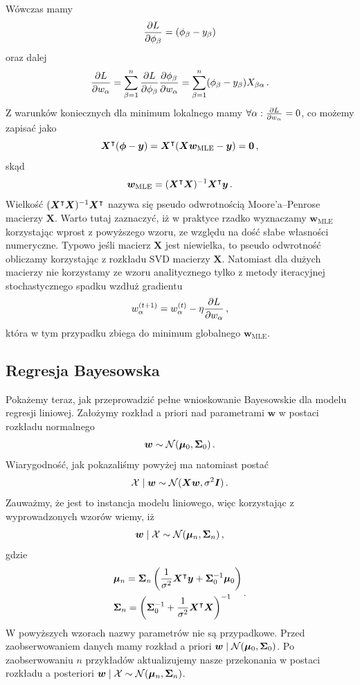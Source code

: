 \documentclass{myclass}
\begin{document}
Wówczas mamy
\[
    \pdv{L}{\phi_\beta} = (\phi_\beta - y_\beta)
\]
oraz dalej
\[
    \pdv{L}{w_\alpha} = \sum_{\beta=1}^n \pdv{L}{\phi_\beta} \pdv{\phi_\beta}{w_\alpha} = \sum_{\beta=1}^n (\phi_\beta - y_\beta) X_{\beta\alpha}\,.
\]
Z warunków koniecznych dla minimum lokalnego mamy \(\forall \alpha : \pdv{L}{w_\alpha} = 0\), co
możemy zapisać jako
\[
    \bm{X}^\intercal(\bm{\phi} - \bm{y}) = \bm{X}^\intercal(\bm{X}\bm{w}_\text{MLE} - \bm{y}) = \bm{0}\,,
\]
skąd
\[
    \bm{w}_\text{MLE} = (\bm{X}^\intercal \bm{X})^{-1} \bm{X}^\intercal \bm{y}\,.
\]
Wielkość \((\bm{X}^\intercal \bm{X})^{-1} \bm{X}^\intercal\) nazywa się pseudo odwrotnością
Moore'a--Penrose macierzy \(\bm{X}\). Warto tutaj zaznaczyć, iż w praktyce rzadko wyznaczamy
\(\bm{w}_\text{MLE}\) korzystając wprost z powyższego wzoru, ze względu na dość słabe własności
numeryczne. Typowo jeśli macierz \(\bm{X}\) jest niewielka, to pseudo odwrotność obliczamy
korzystając z rozkładu SVD macierzy \(\bm{X}\). Natomiast dla dużych macierzy nie korzystamy ze
wzoru analitycznego tylko z metody iteracyjnej stochastycznego spadku wzdłuż gradientu
\[
    w_\alpha^{(t+1)} = w_\alpha^{(t)} - \eta \pdv{L}{w_\alpha}\,,
\]
która w tym przypadku zbiega do minimum globalnego \(\bm{w}_\text{MLE}\).

\subsection{Regresja Bayesowska}

Pokażemy teraz, jak przeprowadzić pełne wnioskowanie Bayesowskie dla modelu regresji liniowej.
Założymy rozkład a priori nad parametrami \(\bm{w}\) w postaci rozkładu normalnego
\[
    \bm{w} \sim \mathcal{N}(\bm{\mu}_0, \bm{\Sigma}_0)\,.
\]
Wiarygodność, jak pokazaliśmy powyżej ma natomiast postać
\[
    \mathcal{X} \mid \bm{w} \sim \mathcal{N}(\bm{X}\bm{w}, \sigma^2 \bm{I})\,.
\]
Zauważmy, że jest to instancja modelu liniowego, więc korzystając z wyprowadzonych wzorów wiemy, iż
\[
    \bm{w} \mid \mathcal{X} \sim \mathcal{N}(\bm{\mu}_n, \bm{\Sigma}_n)\,,
\]
gdzie
\[
\begin{split}
    &\bm{\mu}_n = \bm{\Sigma}_n\left(\frac{1}{\sigma^2} \bm{X}^\intercal \bm{y} + \bm{\Sigma}_0^{-1}\bm{\mu}_0 \right)\\
    &\bm{\Sigma}_n = \left(\bm{\Sigma}_0^{-1} + \frac{1}{\sigma^2} \bm{X}^\intercal \bm{X} \right)^{-1}
\end{split}\,.
\] 
W powyższych wzorach nazwy parametrów nie są przypadkowe. Przed zaobserwowaniem danych mamy rozkład
a priori \(\bm{w} \mid \mathcal{N}(\bm{\mu}_0, \bm{\Sigma}_0)\). Po zaobserwowaniu \(n\) przykładów
aktualizujemy nasze przekonania w postaci rozkładu a posteriori \(\bm{w} \mid \mathcal{X} \sim
\mathcal{N}(\bm{\mu}_n, \bm{\Sigma}_n)\).
\end{document}
